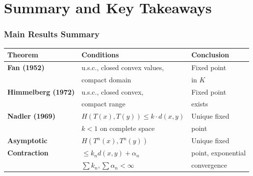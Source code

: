 \documentclass[aspectratio=169,10pt]{beamer}
\begin{document}

\section{Summary and Key Takeaways}

\begin{frame}
\frametitle{Main Results Summary}

\begin{table}[h]
\centering
\small
\begin{tabular}{|l|l|l|}
\hline
\textbf{Theorem} & \textbf{Conditions} & \textbf{Conclusion} \\
\hline
\textbf{Fan (1952)} & u.s.c., closed convex values, & Fixed point \\
& compact domain & in $K$ \\
\hline
\textbf{Himmelberg (1972)} & u.s.c., closed convex, & Fixed point \\
& compact range & exists \\
\hline
\textbf{Nadler (1969)} & $H(T(x), T(y)) \leq k \cdot d(x,y)$ & Unique fixed \\
& $k < 1$ on complete space & point \\
\hline
\textbf{Asymptotic} & $H(T^n(x), T^n(y))$ & Unique fixed \\
\textbf{Contraction} & $\leq k_n d(x,y) + \alpha_n$ & point, exponential \\
& $\sum k_n, \sum \alpha_n < \infty$ & convergence \\
\hline
\end{tabular}
\end{table}

\end{frame}
\end{document}
